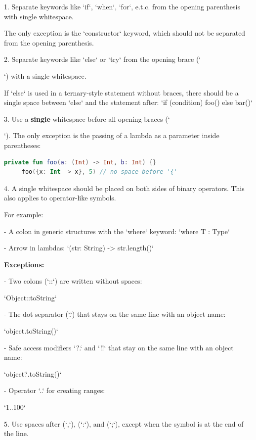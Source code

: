 {{1.  Separate keywords like `if`, `when`, `for`, e.t.c. from the opening parenthesis with single whitespace.

    The only exception is the `constructor` keyword, which should not be separated from the opening parenthesis.



2.  Separate keywords like `else` or `try` from the opening brace (`{`) with a single whitespace.

    If `else` is used in a ternary-style statement without braces, there should be a single space between `else` and the statement after: `if (condition) foo() else bar()`



3.  Use a \textbf{single} whitespace before all opening braces (`{`). The only exception is the passing of a lambda as a parameter inside parentheses:

\begin{lstlisting}[language=Kotlin]
     private fun foo(a: (Int) -> Int, b: Int) {}
     foo({x: Int -> x}, 5) // no space before '{'
\end{lstlisting}


4.  A single whitespace should be placed on both sides of binary operators. This also applies to operator-like symbols.

    For example:



 - A colon in generic structures with the `where` keyword:  `where T : Type`

 - Arrow in lambdas: `(str: String) -> str.length()`



\textbf{Exceptions:}



- Two colons (`::`) are written without spaces:\

  `Object::toString`

- The dot separator (`.`) that stays on the same line with an object name:\

  `object.toString()`

- Safe access modifiers `?.` and `!!` that stay on the same line with an object name:\

  `object?.toString()`

- Operator `..` for creating ranges:\

  `1..100`



5.  Use spaces after (`,`), (`:`), and (`;`), except when the symbol is at the end of the line.

}}}}
